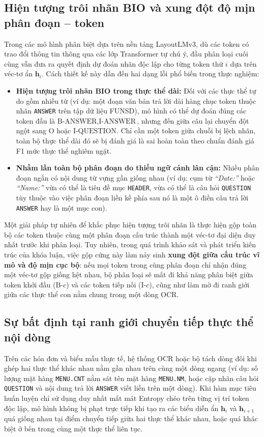 \subsection{Hiện tượng trôi nhãn BIO và xung đột độ mịn phân đoạn -- token}
\label{sec:granularity_conflict}
Trong các mô hình phân biệt dựa trên nền tảng LayoutLMv3, dù các token có trao đổi thông tin thông qua các lớp Transformer tự chú ý, đầu phân loại cuối cùng vẫn đưa ra quyết định dự đoán nhãn độc lập cho từng token thứ $i$ dựa trên véc-tơ ẩn $\mathbf{h}_i$. Cách thiết kế này dẫn đến hai dạng lỗi phổ biến trong thực nghiệm:
\begin{itemize}
    \item \textbf{Hiện tượng trôi nhãn BIO trong thực thể dài:} Đối với các thực thể tự do gồm nhiều từ (ví dụ: một đoạn văn bản trả lời dài hàng chục token thuộc nhãn \texttt{ANSWER} trên tập dữ liệu FUNSD), mô hình có thể dự đoán đúng các token đầu là $\text{B-ANSWER}, \text{I-ANSWER}$, nhưng đến giữa câu lại chuyển đột ngột sang $\text{O}$ hoặc $\text{I-QUESTION}$. Chỉ cần một token giữa chuỗi bị lệch nhãn, toàn bộ thực thể dài đó sẽ bị đánh giá là sai hoàn toàn theo chuẩn đánh giá F1 mức thực thể nghiêm ngặt.
    \item \textbf{Nhầm lẫn toàn bộ phân đoạn do thiếu ngữ cảnh lân cận:} Nhiều phân đoạn ngắn có nội dung từ vựng gần giống nhau (ví dụ: cụm từ \textit{``Date:''} hoặc \textit{``Name:''} vừa có thể là tiêu đề mục \texttt{HEADER}, vừa có thể là câu hỏi \texttt{QUESTION} tùy thuộc vào việc phân đoạn liền kề phía sau nó là một ô điền câu trả lời \texttt{ANSWER} hay là một mục con).
\end{itemize}

Một giải pháp tự nhiên để khắc phục hiện tượng trôi nhãn là thực hiện gộp toàn bộ các token thuộc cùng một phân đoạn cấu trúc thành một véc-tơ đại diện duy nhất trước khi phân loại. Tuy nhiên, trong quá trình khảo sát và phát triển kiến trúc của khóa luận, việc gộp cứng này làm nảy sinh \textbf{xung đột giữa cấu trúc vĩ mô và độ mịn cục bộ}: nếu mọi token trong cùng phân đoạn chỉ nhận đúng một véc-tơ gộp giống hệt nhau, bộ phân loại sẽ mất đi khả năng phân biệt giữa token khởi đầu ($\text{B-}c$) và các token tiếp nối ($\text{I-}c$), cũng như làm mờ đi ranh giới giữa các thực thể con nằm chung trong một dòng OCR.

\subsection{Sự bất định tại ranh giới chuyển tiếp thực thể nội dòng}
Trên các hóa đơn và biểu mẫu thực tế, hệ thống OCR hoặc bộ tách dòng đôi khi ghép hai thực thể khác nhau nằm gần nhau trên cùng một dòng ngang (ví dụ: số lượng mặt hàng \texttt{MENU.CNT} nằm sát tên mặt hàng \texttt{MENU.NM}, hoặc cặp nhãn câu hỏi \texttt{QUESTION} và nội dung trả lời \texttt{ANSWER} viết liền trên một dòng). Khi hàm mục tiêu huấn luyện chỉ sử dụng duy nhất mất mát Entropy chéo trên từng vị trí token độc lập, mô hình không bị phạt trực tiếp khi tạo ra các biểu diễn ẩn $\mathbf{h}_i$ và $\mathbf{h}_{i+1}$ quá giống nhau tại điểm chuyển tiếp giữa hai thực thể khác nhau, hoặc quá khác biệt ở bên trong cùng một thực thể liên tục.

